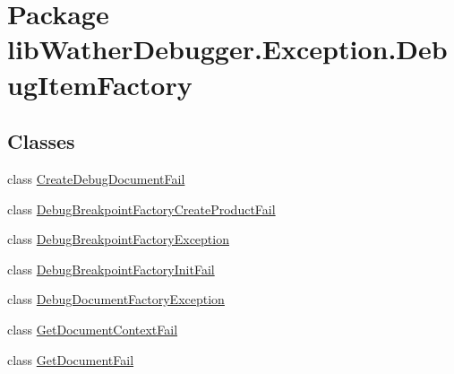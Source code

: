 \hypertarget{namespacelib_wather_debugger_1_1_exception_1_1_debug_item_factory}{\section{Package lib\+Wather\+Debugger.\+Exception.\+Debug\+Item\+Factory}
\label{namespacelib_wather_debugger_1_1_exception_1_1_debug_item_factory}
}
\subsection*{Classes}
\begin{DoxyCompactItemize}
\item 
class \hyperlink{classlib_wather_debugger_1_1_exception_1_1_debug_item_factory_1_1_create_debug_document_fail}{Create\+Debug\+Document\+Fail}
\item 
class \hyperlink{classlib_wather_debugger_1_1_exception_1_1_debug_item_factory_1_1_debug_breakpoint_factory_create_product_fail}{Debug\+Breakpoint\+Factory\+Create\+Product\+Fail}
\item 
class \hyperlink{classlib_wather_debugger_1_1_exception_1_1_debug_item_factory_1_1_debug_breakpoint_factory_exception}{Debug\+Breakpoint\+Factory\+Exception}
\item 
class \hyperlink{classlib_wather_debugger_1_1_exception_1_1_debug_item_factory_1_1_debug_breakpoint_factory_init_fail}{Debug\+Breakpoint\+Factory\+Init\+Fail}
\item 
class \hyperlink{classlib_wather_debugger_1_1_exception_1_1_debug_item_factory_1_1_debug_document_factory_exception}{Debug\+Document\+Factory\+Exception}
\item 
class \hyperlink{classlib_wather_debugger_1_1_exception_1_1_debug_item_factory_1_1_get_document_context_fail}{Get\+Document\+Context\+Fail}
\item 
class \hyperlink{classlib_wather_debugger_1_1_exception_1_1_debug_item_factory_1_1_get_document_fail}{Get\+Document\+Fail}
\end{DoxyCompactItemize}
